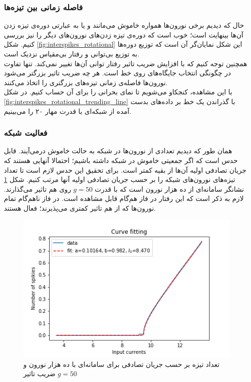 \subsubsection{فاصله زمانی بین تیزه‌ها}
حال که دیدیم برخی نورون‌ها همواره خاموش می‌مانند و یا به عبارتی دوره‌ی تیزه زدن آن‌ها بینهایت است؛ خوب است که دوره‌ی تیزه زدن‌های نورون‌های دیگر را نیز بررسی کنیم. شکل \ref{fig:interspikes_rotational} این شکل نمایان‌گر آن است که توزیع دوره‌ها به توزیع بی‌توانی و رفتار بی‌مقیاس نزدیک است.\\
همچنین توجه کنیم که با افزایش ضریب تاثیر رفتار توانی آن‌ها تغییر نمی‌کند. تنها تفاوت در چگونگی انتخاب جایگاه‌های روی خط است. هر چه ضریب تاثیر بزرگتر می‌شود نورون‌ها فاصله‌ی زمانی تیزه‌های بزرگتری را اتخاذ می‌کنند.
\\
با این مشاهده، کنجکاو می‌شویم تا نمای بحرانی را برای آن حساب کنیم. در شکل \ref{fig:interspikes_rotational_trending_line} با گذراندن یک خط بر داده‌های بدست آمده از شبکه‌ای با قدرت مهار ۲۰ را می‌بینیم.


\subsubsection{فعالیت شبکه}
همان طور که دیدیم تعدادی از نورون‌ها در شبکه به حالت خاموش درمی‌آیند. قابل حدس است که اگر جمعیتی خاموش در شبکه داشته باشیم؛ احتمالا آنهایی هستند که جریان تصادفی اولیه آن‌ها از بقیه کمتر است. برای تحقیق این حدس لازم است تا تعداد تیزه‌های نورون‌های شبکه را بر حسب جریان تصادفی اولیه آنها مرتب کنیم. شکل \ref{fig:spikes_num_vs_background_current} نشانگر سامانه‌ای از ده هزار نورون است که با قدرت $g=50$ روی هم تاثیر می‌گذارند. لازم به ذکر است که این رفتار در فاز هم‌گام قابل مشاهده است. در فاز ناهم‌گام تمام نورون‌ها که از هم تاثیر کمتری می‌پذیرند؛ فعال هستند.

\begin{figure}[b]
	\centering
	\includegraphics[width = 0.5 \textwidth]{../papers_studies/figs/Rotational/spikies_num_vs_input_fitted_curve_g50_input_3.5_13.5.png}
	\caption{تعداد تیزه بر حسب جریان تصادفی برای سامانه‌ای با ده هزار نورون و ضریب تاثیر $g=50$}
	\label{fig:spikes_num_vs_background_current}
\end{figure}


